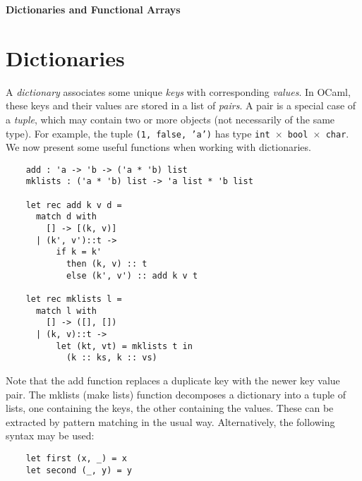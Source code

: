 \documentclass[12pt]{article}
\begin{document}
\begin{center}\LARGE\bf
    Dictionaries and Functional Arrays
\end{center}

\section{Dictionaries}
A \textit{dictionary} associates some unique \textit{keys} with corresponding \textit{values}. In OCaml,
these keys and their values are stored in a list of \textit{pairs}. A pair is a special case of a \textit{tuple}, which
may contain two or more objects (not necessarily of the same type). For example, the tuple \texttt{(1, false, 'a')} has
type \texttt{int $\times$ bool $\times$ char}. We now present some useful functions when working with dictionaries.
\begin{lstlisting}
    add : 'a -> 'b -> ('a * 'b) list
    mklists : ('a * 'b) list -> 'a list * 'b list

    let rec add k v d =
      match d with
        [] -> [(k, v)]
      | (k', v')::t ->
          if k = k'
            then (k, v) :: t
            else (k', v') :: add k v t

    let rec mklists l =
      match l with
        [] -> ([], [])
      | (k, v)::t ->
          let (kt, vt) = mklists t in
            (k :: ks, k :: vs)
\end{lstlisting}
Note that the add function replaces a duplicate key with the newer key value pair. The mklists (make lists)
function decomposes a dictionary into a tuple of lists, one containing the keys, the other containing the values.
These can be extracted by pattern matching in the usual way. Alternatively, the following syntax may be used:
\begin{lstlisting}
    let first (x, _) = x
    let second (_, y) = y
\end{lstlisting}
\end{document}
